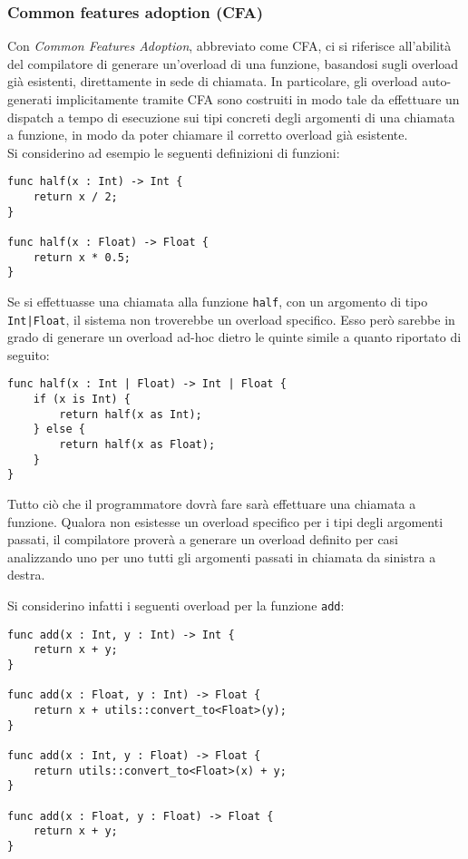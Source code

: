 \subsubsection{Common features adoption (CFA)}
Con \textit{Common Features Adoption}, abbreviato come CFA, ci si riferisce all’abilità del compilatore di generare un'overload di 
una funzione, basandosi sugli overload già esistenti, direttamente in sede di chiamata. In particolare, gli overload auto-generati 
implicitamente tramite CFA sono costruiti in modo tale da effettuare un dispatch a tempo di esecuzione sui tipi concreti degli argomenti
di una chiamata a funzione, in modo da poter chiamare il corretto overload già esistente. \\

Si considerino ad esempio le seguenti definizioni di funzioni:

\vspace{0.5cm}
\begin{lstlisting}[frame=single]
func half(x : Int) -> Int {
    return x / 2;
}

func half(x : Float) -> Float {
    return x * 0.5;
}
\end{lstlisting}
\vspace{0.5cm}

Se si effettuasse una chiamata alla funzione \texttt{half}, con un argomento di tipo 
\texttt{Int|Float}, il sistema non troverebbe un overload specifico. Esso però sarebbe in grado 
di generare un overload ad-hoc dietro le quinte simile a quanto riportato di seguito:

\vspace{0.5cm}
\begin{lstlisting}[frame=single]
func half(x : Int | Float) -> Int | Float {
    if (x is Int) {
        return half(x as Int);
    } else {
        return half(x as Float);
    }
}
\end{lstlisting}
\vspace{0.5cm}

Tutto ciò che il programmatore dovrà fare sarà effettuare una chiamata a funzione. Qualora non esistesse 
un overload specifico per i tipi degli argomenti passati, il compilatore proverà a generare un overload 
definito per casi analizzando uno per uno tutti gli argomenti passati in chiamata da sinistra a destra.

Si considerino infatti i seguenti overload per la funzione \texttt{add}:

\vspace{0.5cm}
\begin{lstlisting}[frame=single]
func add(x : Int, y : Int) -> Int {
    return x + y;
}

func add(x : Float, y : Int) -> Float {
    return x + utils::convert_to<Float>(y);
}

func add(x : Int, y : Float) -> Float {
    return utils::convert_to<Float>(x) + y;
}

func add(x : Float, y : Float) -> Float {
    return x + y;
}
\end{lstlisting}
\vspace{0.5cm}

